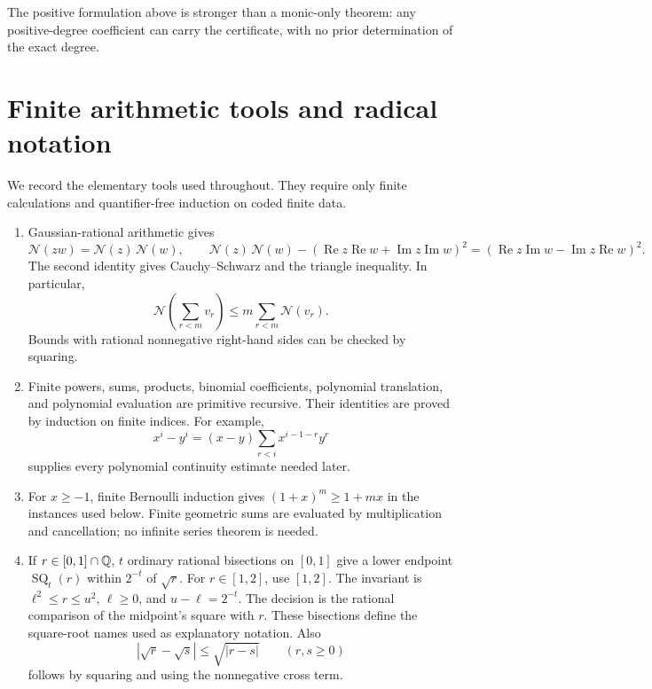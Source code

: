 \documentclass[11pt,letterpaper]{article}
\theoremstyle{definition}\newtheorem{definition}[theorem]{Definition}
\theoremstyle{remark}\newtheorem{remark}[theorem]{Remark}
\newcommand{\nn}[1]{\mathcal N(#1)}
\newcommand{\re}{\operatorname{Re}}\newcommand{\im}{\operatorname{Im}}
\begin{document}
The positive formulation above is stronger than a monic-only theorem: any
positive-degree coefficient can carry the certificate, with no prior
determination of the exact degree.

\section{Finite arithmetic tools and radical notation}
\label{sec:finite}

We record the elementary tools used throughout. They require only finite
calculations and quantifier-free induction on coded finite data.

\begin{enumerate}
\item Gaussian-rational arithmetic gives
\[
 \nn{zw}=\nn z\,\nn w,
 \qquad
 \nn z\,\nn w-(\re z\re w+\im z\im w)^2
       =(\re z\im w-\im z\re w)^2.
\]
The second identity gives Cauchy--Schwarz and the triangle inequality.
In particular,
\[
 \nn{\sum_{r<m}v_r}\le m\sum_{r<m}\nn{v_r}.
\]
Bounds with rational nonnegative right-hand sides can be checked by squaring.

\item Finite powers, sums, products, binomial coefficients, polynomial
translation, and polynomial evaluation are primitive recursive. Their
identities are proved by induction on finite indices. For example,
\begin{equation}
 x^i-y^i=(x-y)\sum_{r<i}x^{i-1-r}y^r
 \label{eq:power-diff}
\end{equation}
supplies every polynomial continuity estimate needed later.

\item For $x\ge-1$, finite Bernoulli induction gives
$(1+x)^m\ge1+mx$ in the instances used below. Finite geometric sums are
evaluated by multiplication and cancellation; no infinite series theorem
is needed.

\item If $r\in[0,1]\cap\mathbb Q$, $t$ ordinary rational bisections on $[0,1]$
give a lower endpoint $\operatorname{SQ}_t(r)$ within $2^{-t}$ of $\sqrt r$.
For $r\in[1,2]$, use $[1,2]$. The invariant is
$\ell^2\le r\le u^2$, $\ell\ge0$, and $u-\ell=2^{-t}$.
The decision is the rational comparison of the midpoint's square with $r$.
These bisections define the square-root names used as explanatory notation.
Also
\begin{equation}
 |\sqrt r-\sqrt s|\le\sqrt{|r-s|}\qquad(r,s\ge0)
 \label{eq:sqrt-holder}
\end{equation}
follows by squaring and using the nonnegative cross term.
\end{enumerate}
\end{document}
